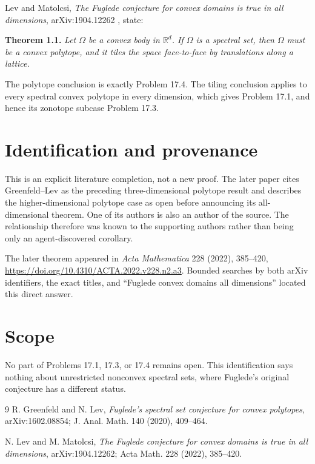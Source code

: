 \documentclass[11pt]{article}
\begin{document}
Lev and Matolcsi, \emph{The Fuglede conjecture for convex domains is true in
all dimensions}, arXiv:1904.12262 \cite{LM}, state:

\medskip
\noindent\textbf{Theorem 1.1.}
\emph{Let $\Omega$ be a convex body in $\mathbb{R}^d$. If $\Omega$ is a
spectral set, then $\Omega$ must be a convex polytope, and it tiles the space
face-to-face by translations along a lattice.}
\medskip

The polytope conclusion is exactly Problem 17.4. The tiling conclusion applies
to every spectral convex polytope in every dimension, which gives Problem
17.1, and hence its zonotope subcase Problem 17.3.

\newpage
\section*{Identification and provenance}

This is an explicit literature completion, not a new proof. The later paper
cites Greenfeld--Lev as the preceding three-dimensional polytope result and
describes the higher-dimensional polytope case as open before announcing its
all-dimensional theorem. One of its authors is also an author of the source.
The relationship therefore was known to the supporting authors rather than
being only an agent-discovered corollary.

The later theorem appeared in \emph{Acta Mathematica} 228 (2022), 385--420,
\url{https://doi.org/10.4310/ACTA.2022.v228.n2.a3}. Bounded searches by both arXiv identifiers,
the exact titles, and ``Fuglede convex domains all dimensions'' located this
direct answer.

\section*{Scope}

No part of Problems 17.1, 17.3, or 17.4 remains open. This identification says
nothing about unrestricted nonconvex spectral sets, where Fuglede's original
conjecture has a different status.

\begin{thebibliography}{9}
R. Greenfeld and N. Lev,
\emph{Fuglede's spectral set conjecture for convex polytopes},
arXiv:1602.08854; J. Anal. Math. 140 (2020), 409--464.

N. Lev and M. Matolcsi,
\emph{The Fuglede conjecture for convex domains is true in all dimensions},
arXiv:1904.12262; Acta Math. 228 (2022), 385--420.
\end{thebibliography}
\end{document}
